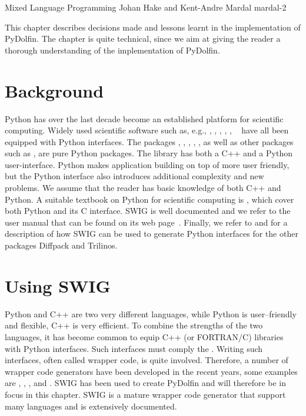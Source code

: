               {Mixed Language Programming}
              {Johan Hake and Kent-Andre Mardal}
              {mardal-2}


This chapter describes decisions made and lessons learnt
in the implementation of PyDolfin. The chapter is quite technical, since
we aim at giving the reader a thorough understanding of the implementation
of PyDolfin. 

\section{Background}
Python has over the last decade become an established platform
for scientific computing. Widely used scientific software such as, e.g.,
\citet{www:petsc}, \citet{www:hypre},
\citet{www:trilinos}, \cite{www:vtk}, \cite{www:vmtk},
\ginac~\citep{BauerFrinkKreckel2000} have all been equipped with Python
interfaces. The \fenics
packages \ferari, \fiat , \ffc,
\ufl, \viper, as well as  other packages such as 
\sympy\cite{CertikSeoanePetersonEtAl2009},
\scipy\cite{JonesOliphantPetersonEtAl2009} are pure Python packages.
The \dolfin library has both a C++ and a Python user-interface. Python
makes application building on top of \dolfin more user friendly, but
the Python interface also introduces additional complexity and new
problems.  We assume that the reader has basic knowledge of both C++
and Python. A suitable textbook on Python for scientific computing is
\cite{Langtangen2008}, which cover both Python and its C interface.
SWIG is well documented and we refer to the user manual that can be
found on its web page~\cite{www:swig}. Finally, we refer to
\citet{Langtangen2003b} and \citet{SalaSpotzHeroux2008} for a
description of how SWIG can be used to generate Python interfaces for
the other packages Diffpack and Trilinos.


\section{Using SWIG}

Python and C++ are two very different languages, while Python is
user--friendly and flexible, C++ is very efficient. 
To combine the strengths of the two languages, it has become common
to equip C++ (or FORTRAN/C) libraries with Python interfaces. 
Such interfaces must comply the \citet{www:python-capi}.   
Writing such interfaces, often called wrapper code, is quite involved.
Therefore, a number of wrapper code generators have been developed in the
recent years, some examples are   
 \citet{Peterson}, \citet{SIP}, \citet{Siloon}, and \citet{www:swig}. 
 SWIG has been used to create PyDolfin and will therefore be in focus in
 this chapter. SWIG is a mature wrapper code generator that support many languages and is extensively documented.

